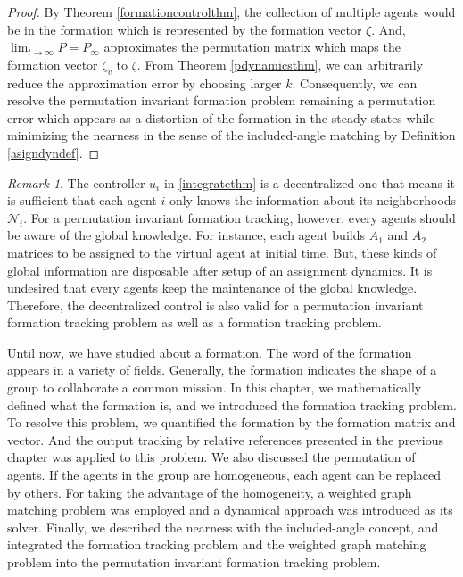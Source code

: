 \documentclass[11pt, a4paper, oneside, openany, reqno]{book}
\theoremstyle{definition}
\theoremstyle{remark}
\newtheorem{remark}[theorem]{Remark}
\numberwithin{equation}{chapter} %
\newcommand{\NBR}{\mathcal{N}}
\begin{document}
\begin{proof}
	By Theorem \ref{formationcontrolthm}, the collection of multiple agents would be in the formation
	which is represented by the formation vector $ \zeta $. And,
	$ \lim_{t \to \infty} P = P_\infty $ approximates the permutation matrix
	which maps the formation vector $ \zeta_v $ to $ \zeta $.
	From Theorem \ref{pdynamicsthm}, we can arbitrarily reduce the approximation error by choosing larger $ k $.
	Consequently, we can resolve the permutation invariant formation problem remaining 
	a permutation error which appears as a distortion of the formation in the steady states
	while minimizing the nearness in the sense of the included-angle matching by Definition \ref{asigndyndef}.
\end{proof}

\begin{remark}
	The controller $ u_i $ in \eqref{integratethm} is a decentralized one that means 
	it is sufficient that each agent $ i $ only knows the information about its neighborhoods $ \NBR_i $.
	For a permutation invariant formation tracking, however, 
	every agents should be aware of the global knowledge. For instance, 
	each agent builds $ A_1 $ and $ A_2 $ matrices to be assigned to the virtual agent at initial time.	
	But, these kinds of global information are disposable after setup of an assignment dynamics. 
	It is undesired that every agents keep the maintenance of the global knowledge.
	Therefore, the decentralized control is also valid for a permutation invariant formation tracking problem
	as well as a formation tracking problem.
\end{remark}
	
Until now, we have studied about a formation. The word of the formation appears in a variety of fields.
Generally, the formation indicates the shape of a group to collaborate a common mission.
In this chapter, we mathematically defined what the formation is,
and we introduced the formation tracking problem. 
To resolve this problem, we quantified the formation by the formation matrix and vector.
And the output tracking by relative references presented in the previous chapter 
was applied to this problem.
We also discussed the permutation of agents. 
If the agents in the group are homogeneous, each agent can be replaced by others.
For taking the advantage of the homogeneity, a weighted graph matching problem was employed
and a dynamical approach was introduced as its solver.
Finally, we described the nearness with the included-angle concept,
and integrated the formation tracking problem and the weighted graph matching problem into
the permutation invariant formation tracking problem.
\end{document}
